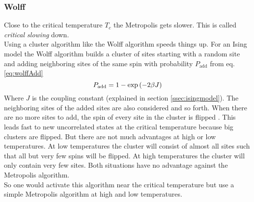     \subsubsection{Wolff}
    \label{sssec:wolff}
        Close to the critical temperature \(T_c\) the Metropolis
        gets slower. This is called \emph{critical slowing} down.\\
        Using a cluster algorithm like the Wolff
        algorithm \cite{Wolff1989} speeds things up.
        For an Ising model the Wolff algorithm builds a cluster of sites
        starting with a random site and adding neighboring sites of the
        same spin with probability \(P_{\mathrm{add}}\) from eq. \eqref{eq:wolffAdd}
        \begin{equation}
            P_{\mathrm{add}} = 1-\exp\left(-2\beta J\right)
            \label{eq:wolffAdd}
        \end{equation}
        Where \(J\) is the coupling constant (explained in section
        \ref{ssec:isingmodel}). The neighboring sites of the added sites
        are also considered and so forth. When there are no more sites
        to add, the spin of every site in the cluster is flipped
        \cite[S. ??]{NewmanBarkema1999} \cite[S. 151f]{Katzgraber2011}.
        This leads fast to new uncorrelated states at the critical
        temperature because big clusters are flipped. But there are not
        much advantages at high or low temperatures. At low temperatures
        the cluster will consist of almost all sites such that all but
        very few spins will be flipped. At high temperatures the cluster
        will only contain very few sites.
        Both situations have no advantage against the Metropolis algorithm.\\
        So one would activate this algorithm near the critical temperature
        but use a simple Metropolis algorithm at high and low temperatures.

